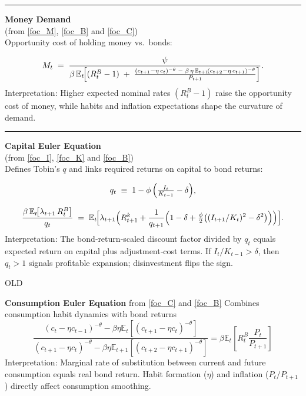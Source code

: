 \documentclass[11pt,preprint]{elsarticle}
\numberwithin{equation}{section}
\numberwithin{figure}{section}
\numberwithin{table}{section}
\begin{document}
\begin{center}\rule{0.5\linewidth}{0.5pt}\end{center}

\textbf{Money Demand}\\
(from \eqref{foc_M}, \eqref{foc_B} and \eqref{foc_C})\\
Opportunity cost of holding money vs.~bonds:

\[
  M_t
  \;=\;
  \frac{\psi}
       {\beta\,\mathbb{E}_t\!\Bigl[
         (R_t^B - 1)
         \;+\;
         \frac{(c_{t+1} - \eta\,c_t)^{-\theta}
               \;-\;
               \beta\,\eta\,\mathbb{E}_{t+1}\!(c_{t+2} - \eta\,c_{t+1})^{-\theta}}
              {P_{t+1}}
       \Bigr]}.
\] Interpretation: Higher expected nominal rates \((R_t^B - 1)\) raise
the opportunity cost of money, while habits and inflation expectations
shape the curvature of demand.

\begin{center}\rule{0.5\linewidth}{0.5pt}\end{center}

\textbf{Capital Euler Equation}\\
(from \eqref{foc_I}, \eqref{foc_K} and \eqref{foc_B})\\
Defines Tobin's \(q\) and links required returns on capital to bond
returns:

\[
  q_t \;\equiv\; 1 - \phi\,\Bigl(\tfrac{I_t}{K_{t-1}} - \delta\Bigr),
\]

\[
  \frac{\beta\,\mathbb{E}_t\!\bigl[\lambda_{t+1}\,R_t^B\bigr]}{q_t}
  \;=\;
  \mathbb{E}_t\!\Bigl[
    \lambda_{t+1}\Bigl(
      R_{t+1}^k
      + \frac{1}{q_{t+1}}
        \Bigl(
          1 - \delta
          + \tfrac{\phi}{2}\bigl((I_{t+1}/K_t)^2 - \delta^2\bigr)
        \Bigr)
    \Bigr)
  \Bigr].
\] Interpretation: The bond‐return‐scaled discount factor divided by
\(q_t\) equals expected return on capital plus adjustment‐cost terms. If
\(I_t/K_{t-1}>\delta\), then \(q_t>1\) signals profitable expansion;
disinvestment flips the sign.

OLD

\newpage

\textbf{Consumption Euler Equation} from \ref{foc_C} and \ref{foc_B}
Combines consumption habit dynamics with bond returns
\begin{equation}\label{reduced_C}
\frac{(c_t - \eta c_{t-1})^{-\theta} - \beta\eta \mathbb{E}_t[(c_{t+1} - \eta c_t)^{-\theta}]}
     {(c_{t+1} - \eta c_t)^{-\theta} - \beta\eta \mathbb{E}_{t+1}[(c_{t+2} - \eta c_{t+1})^{-\theta}]}
= \beta \mathbb{E}_t \left[ R^B_t \frac{P_t}{P_{t+1}} \right]
\end{equation} Interpretation: Marginal rate of substitution between
current and future consumption equals real bond return. Habit formation
(\(\eta\)) and inflation (\(P_t/P_{t+1}\)) directly affect consumption
smoothing.
\end{document}
